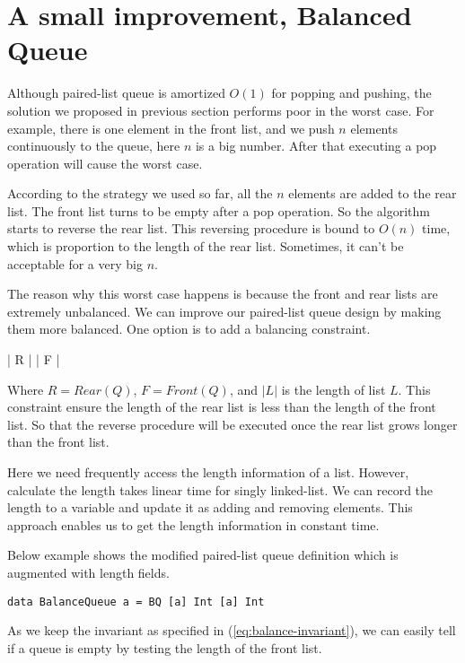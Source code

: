 \documentclass{article}
\begin{document}
\section{A small improvement, Balanced Queue}

Although paired-list queue is amortized $O(1)$ for popping and pushing,
the solution we proposed in previous section performs poor in the worst case.
For example, there is one element in the front list, and we push $n$ elements
continuously to the queue, here $n$ is a big number. After that executing
a pop operation will cause the worst case.

According to the strategy we used so far, all the $n$ elements are added
to the rear list. The front list turns to be empty after a pop operation.
So the algorithm starts to reverse the rear list. This reversing procedure
is bound to $O(n)$ time, which is proportion to the length of the rear
list. Sometimes, it can't be
acceptable for a very big $n$.

The reason why this worst case happens is because the front and rear lists
are extremely unbalanced. We can improve our paired-list queue design
by making them more balanced. One option is to add a balancing constraint.

\be
  | R | \leq | F |
\label{eq:balance-invariant}
\ee

Where $R = Rear(Q)$, $F = Front(Q)$, and $|L|$ is the length of list $L$.
This constraint ensure the length
of the rear list is less than the length of the front list. So that the reverse
procedure will be executed once the rear list grows longer than
the front list.

Here we need frequently access the length information of a list. However,
calculate the length takes linear time for singly linked-list. We can
record the length to a variable and update it as adding and removing elements.
This approach enables us to get the length information in constant time.

Below example shows the modified paired-list queue definition which is augmented
with length fields.

\lstset{language=Haskell}
\begin{lstlisting}
data BalanceQueue a = BQ [a] Int [a] Int
\end{lstlisting}

As we keep the invariant as specified in (\ref{eq:balance-invariant}), we
can easily tell if a queue is empty by testing the length of the front list.
\end{document}
